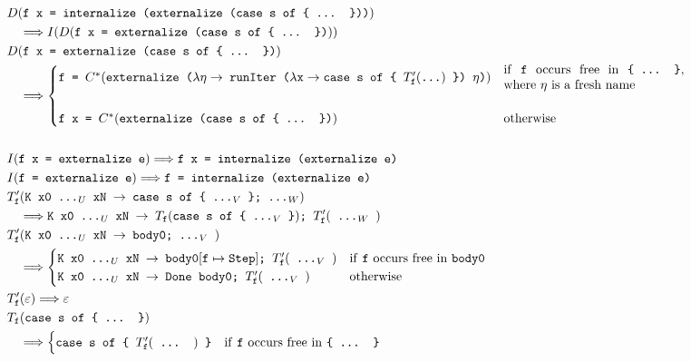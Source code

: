 \documentclass[runningheads, a4paper]{llncs}
\newcommand{\expr}[1]{(#1)} %
\newcommand{\rarr}{\rightarrow}
\newcommand{\rewrites}{\Longrightarrow}
\newcommand{\tdots}{\ttt{...}}
\newcommand{\exprdots}{\expr{\tdots}}
\newcommand{\ttt}{\texttt}
\begin{document}
\begin{figure}[hp]
  \centering
\begin{align*}
  &D\expr{\ttt{f x = internalize (externalize (case s of \{ ... \}))}}\\
      &\quad\rewrites I(D(\ttt{f x = externalize (case s of \{ ... \})}))\\
  &D\expr{\ttt{f x = externalize (case s of \{ ... \})}}\\
      &\quad\rewrites \begin{cases}
        \ttt{f = $C^{*}\expr{\ttt{externalize ($\lambda \eta \rarr$ runIter ($\lambda \ttt{x} \rarr \ttt{case s of \{ $T'_{\ttt{f}}\exprdots$}$ \}) $\eta$)}}$} & \text{\parbox{5cm}{if \ttt{f} occurs free in \ttt{\{ ... \}}, where $\eta$ is a fresh name}}\\
        \\
        \ttt{f x = $C^{*}\expr{\ttt{externalize (case s of \{ ... \})}}$} & \text{otherwise}
      \end{cases}\\
  &\\
  &I\expr{\ttt{f x = externalize e}} \rewrites \ttt{f x = internalize (externalize e)}\\
  &I\expr{\ttt{f = externalize e}} \rewrites \ttt{f = internalize (externalize e)}\\
  &T'_{\ttt{f}}\expr{\ttt{K x0 ...$_U$ xN $\rarr$ case s of \{ ...$_V$ \}; ...$_W$}}\\
    &\quad\rewrites
        \ttt{K x0 ...$_U$ xN $\rarr$ $T_{\ttt{f}}\expr{\ttt{case s of \{ ...$_V$ \}}}$; $T'_{\ttt{f}}\expr{\ttt{ ...$_W$ }}$}\\
  &T'_{\ttt{f}}\expr{\ttt{K x0 ...$_U$ xN $\rarr$ body0; ...$_V$ }}\\
    &\quad\rewrites
      \begin{cases}
        \ttt{K x0 ...$_U$ xN $\rarr$ body0}[\ttt{f} \mapsto \ttt{Step}]\ttt{; }T'_{\ttt{f}}\expr{\ttt{ ...$_V$ }} & \text{if \ttt{f} occurs free in \ttt{body0}}\\
        \ttt{K x0 ...$_U$ xN $\rarr$ Done body0; $T'_{\ttt{f}}\expr{\ttt{ ...$_V$ }}$} & \text{otherwise}
      \end{cases}\\
  &T'_{\ttt{f}}\expr{\varepsilon} \rewrites \varepsilon\\
  &T_{\ttt{f}}\expr{\ttt{case s of \{ ... \}}}\\
    &\quad\rewrites
      \begin{cases}
        \ttt{case s of \{ $T'_{\ttt{f}}\expr{\ttt{ ... }}$ \}} & \text{if \ttt{f} occurs free in \ttt{\{ ... \}}}\\

\end{cases}
\end{align*}
\end{figure}
\end{document}
